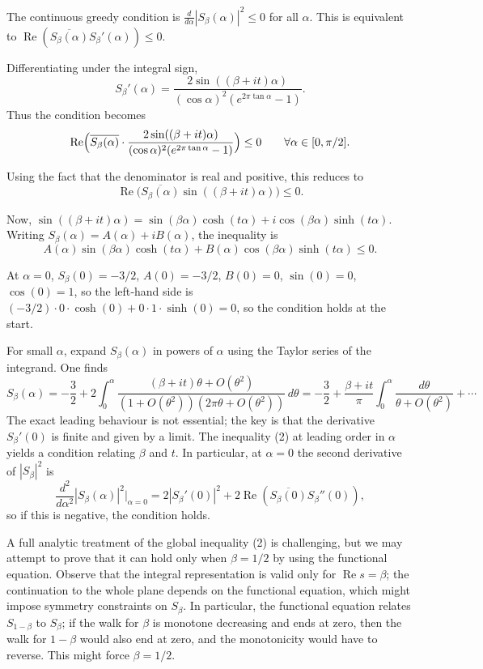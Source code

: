 \documentclass[11pt,a4paper]{article}
\newcommand{\RE}{\operatorname{Re}}
\begin{document}
The continuous greedy condition is $\frac{d}{d\alpha} |S_\beta(\alpha)|^2 \le 0$ for all $\alpha$.  This is equivalent to $\RE( \overline{S_\beta(\alpha)} S_\beta'(\alpha) ) \le 0$.

Differentiating under the integral sign,
\[
S_\beta'(\alpha) = \frac{2\sin((\beta+it)\alpha)}{(\cos\alpha)^{2}(e^{2\pi\tan\alpha}-1)} .
\]
Thus the condition becomes
\[
\RE \Bigl( \overline{S_\beta(\alpha)} \cdot \frac{2\sin((\beta+it)\alpha)}{(\cos\alpha)^{2}(e^{2\pi\tan\alpha}-1)} \Bigr) \le 0 \qquad \forall \alpha \in [0,\pi/2].
\]

Using the fact that the denominator is real and positive, this reduces to
\[
\RE \bigl( \overline{S_\beta(\alpha)} \sin((\beta+it)\alpha) \bigr) \le 0.
\]

Now, $\sin((\beta+it)\alpha) = \sin(\beta\alpha)\cosh(t\alpha) + i \cos(\beta\alpha)\sinh(t\alpha)$.  Writing $S_\beta(\alpha) = A(\alpha) + i B(\alpha)$, the inequality is
\[
A(\alpha) \sin(\beta\alpha)\cosh(t\alpha) + B(\alpha) \cos(\beta\alpha)\sinh(t\alpha) \le 0.
\tag{2}
\]

At $\alpha = 0$, $S_\beta(0) = -3/2$, $A(0)=-3/2$, $B(0)=0$, $\sin(0)=0$, $\cos(0)=1$, so the left‑hand side is $(-3/2) \cdot 0 \cdot \cosh(0) + 0 \cdot 1 \cdot \sinh(0) = 0$, so the condition holds at the start.

For small $\alpha$, expand $S_\beta(\alpha)$ in powers of $\alpha$ using the Taylor series of the integrand.  One finds
\[
S_\beta(\alpha) = -\frac32 + 2 \int_{0}^{\alpha} \frac{ (\beta+it)\theta + O(\theta^2) }{ (1+O(\theta^2)) ( 2\pi\theta + O(\theta^2) ) }\,d\theta
= -\frac32 + \frac{\beta+it}{\pi} \int_{0}^{\alpha} \frac{d\theta}{\theta + O(\theta^2)} + \cdots
\]
The exact leading behaviour is not essential; the key is that the derivative $S_\beta'(0)$ is finite and given by a limit.  The inequality (2) at leading order in $\alpha$ yields a condition relating $\beta$ and $t$.  In particular, at $\alpha = 0$ the second derivative of $|S_\beta|^2$ is
\[
\frac{d^2}{d\alpha^2} |S_\beta(\alpha)|^2 \Big|_{\alpha=0} = 2|S_\beta'(0)|^2 + 2\RE( \overline{S_\beta(0)} S_\beta''(0) ),
\]
so if this is negative, the condition holds.

A full analytic treatment of the global inequality (2) is challenging, but we may attempt to prove that it can hold only when $\beta = 1/2$ by using the functional equation.  Observe that the integral representation is valid only for $\RE s = \beta$; the continuation to the whole plane depends on the functional equation, which might impose symmetry constraints on $S_\beta$.  In particular, the functional equation relates $S_{1-\beta}$ to $S_\beta$; if the walk for $\beta$ is monotone decreasing and ends at zero, then the walk for $1-\beta$ would also end at zero, and the monotonicity would have to reverse.  This might force $\beta = 1/2$.
\end{document}
